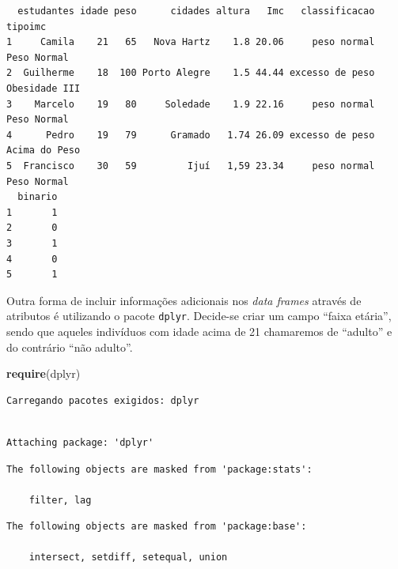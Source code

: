 \documentclass[12pt,portuguese,oneside]{book}
\newenvironment{Shaded}{\begin{snugshade}}{\end{snugshade}}
\newcommand{\KeywordTok}[1]{\textcolor[rgb]{0.13,0.29,0.53}{\textbf{#1}}}
\newcommand{\DecValTok}[1]{\textcolor[rgb]{0.00,0.00,0.81}{#1}}
\newcommand{\StringTok}[1]{\textcolor[rgb]{0.31,0.60,0.02}{#1}}
\newcommand{\OperatorTok}[1]{\textcolor[rgb]{0.81,0.36,0.00}{\textbf{#1}}}
\newcommand{\NormalTok}[1]{#1}
\begin{document}
\begin{verbatim}
  estudantes idade peso      cidades altura   Imc   classificacao       tipoimc
1     Camila    21   65   Nova Hartz    1.8 20.06     peso normal   Peso Normal
2  Guilherme    18  100 Porto Alegre    1.5 44.44 excesso de peso Obesidade III
3    Marcelo    19   80     Soledade    1.9 22.16     peso normal   Peso Normal
4      Pedro    19   79      Gramado   1.74 26.09 excesso de peso Acima do Peso
5  Francisco    30   59         Ijuí   1,59 23.34     peso normal   Peso Normal
  binario
1       1
2       0
3       1
4       0
5       1
\end{verbatim}

Outra forma de incluir informações adicionais nos \emph{data frames}
através de atributos é utilizando o pacote \texttt{dplyr}. Decide-se
criar um campo ``faixa etária'', sendo que aqueles indivíduos com idade
acima de 21 chamaremos de ``adulto'' e do contrário ``não adulto''.

\begin{Shaded}
\begin{Highlighting}[]
\KeywordTok{require}\NormalTok{(dplyr)}
\end{Highlighting}
\end{Shaded}

\begin{verbatim}
Carregando pacotes exigidos: dplyr
\end{verbatim}

\begin{verbatim}

Attaching package: 'dplyr'
\end{verbatim}

\begin{verbatim}
The following objects are masked from 'package:stats':

    filter, lag
\end{verbatim}

\begin{verbatim}
The following objects are masked from 'package:base':

    intersect, setdiff, setequal, union
\end{verbatim}

\begin{Shaded}
\end{Shaded}
\end{document}
